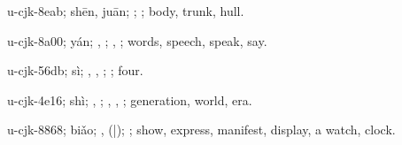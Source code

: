 \begin{multicols}{2}
{\cjkgGlue{}u-cjk-8eab; shēn, juān; \cjkgGlue{}; \cjkgGlue{}; body, trunk, hull.

\cjkgGlue{}u-cjk-8a00; yán; \cjkgGlue{}\cjkgGlue{}\cjkgGlue{}, \cjkgGlue{}; \cjkgGlue{}, \cjkgGlue{}; words, speech, speak, say.

\cjkgGlue{}u-cjk-56db; sì; \cjkgGlue{}\cjkgGlue{}\cjkgGlue{}, \cjkgGlue{}\cjkgGlue{}\cjkgGlue{}, \cjkgGlue{}; \cjkgGlue{}; four.

\cjkgGlue{}u-cjk-4e16; shì; \cjkgGlue{}, \cjkgGlue{}; \cjkgGlue{}, \cjkgGlue{}, \cjkgGlue{}; generation, world, era.

\cjkgGlue{}u-cjk-8868; biǎo; \cjkgGlue{}, \cjkgGlue{}\cjkgGlue{}(\cjkgGlue{}|\cjkgGlue{}); \cjkgGlue{}; show, express, manifest, display, a watch, clock.

}
\end{multicols}
